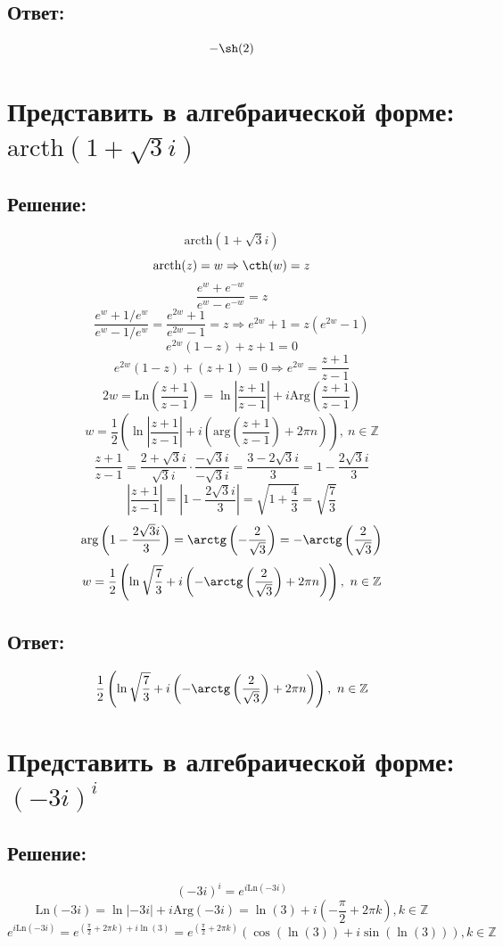 \documentclass{article}
\begin{document}
	\subsection{Ответ:}
	\[-\sh(2)\]
	
	\section{Представить в алгебраической форме: $\text{arcth}(1+ \sqrt{3}i)$}
	\subsection{Решение:}
	\[\text{arcth}(1+ \sqrt{3}i)\]
	\[\text{arcth}(z) = w \Rightarrow \cth(w) = z\]
	\[\frac{e^w + e^{-w}}{e^w - e^{-w}} = z\]
	\[\frac{e^w + 1/e^w}{e^w - 1/e^w} = \frac{e^{2w}+1}{e^{2w}-1} = z \Rightarrow e^{2w} + 1 = z \left(e^{2w} -1\right)\]
	\[e^{2w}(1-z) +z +1 = 0\]
	\[e^{2w}(1-z) + (z+1) = 0 \Rightarrow e^{2w} = \frac{z+1}{z-1}\]
	\[2w = \text{Ln}\left(\frac{z+1}{z-1}\right) = \ln \left|\frac{z+1}{z-1}\right| + i\text{Arg}\left(\frac{z+1}{z-1}\right) \]
	\[w=  \frac{1}{2} \left(\ln \left|\frac{z+1}{z-1}\right| + i\left(\text{arg}\left(\frac{z+1}{z-1}\right) +2\pi n\right)\right), \ n \in \mathbb{Z}\]
	\[\frac{z+1}{z-1} = \frac{2 + \sqrt{3}i}{\sqrt{3}i}\cdot \frac{-\sqrt{3}i}{-\sqrt{3}i} = \frac{3 - 2\sqrt{3}i}{3} = 1 - \frac{2\sqrt{3}i}{3}\]
	\[\left|\frac{z+1}{z-1} \right| = \left|1 - \frac{2\sqrt{3}i}{3}\right| = \sqrt{1 + \frac{4}{3}} = \sqrt{\frac{7}{3}}\]
	\[\text{arg}\left(1 -\frac{2\sqrt{3}i}{3}\right) = \arctg\left(-\frac{2}{\sqrt{3}}\right) = -\arctg\left(\frac{2}{\sqrt{3}}\right)\]
	\[w = \frac{1}{2} \left(\ln\sqrt{\frac{7}{3}} + i \left(-\arctg\left(\frac{2}{\sqrt{3}}\right) + 2\pi n\right)\right), \ n \in \mathbb{Z}\]
	\subsection{Ответ:}
	\[\frac{1}{2} \left(\ln\sqrt{\frac{7}{3}} + i \left(-\arctg\left(\frac{2}{\sqrt{3}}\right) + 2\pi n\right)\right), \ n \in \mathbb{Z}\]
	
	\section{Представить в алгебраической форме: $(-3i)^i$}
	\subsection{Решение:}
	\[(-3i)^i = e^{i\text{Ln}(-3i)}\]
	\[\text{Ln}(-3i) = \ln |-3i| + i\text{Arg}(-3i) = \ln(3) + i\left(-\frac{\pi}{2} + 2\pi k\right), k \in \mathbb{Z}\]
	\[e^{i\text{Ln}(-3i)} = e ^ {\left(\frac{\pi}{2} + 2\pi k\right) + i\ln(3)} = e ^ {\left(\frac{\pi}{2} + 2\pi k\right)}\left(\cos\left(\ln(3)\right) + i\sin\left(\ln(3)\right)\right), k \in \mathbb{Z}\]
\end{document}
